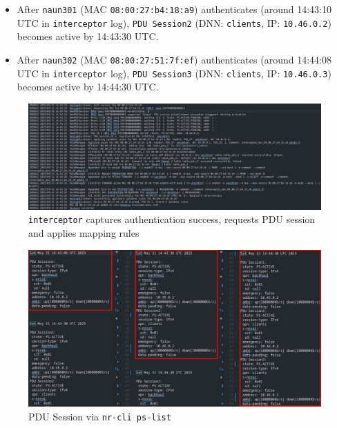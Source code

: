 \begin{itemize}
{\begin{itemize}
            \item After \texttt{naun301} (\ac{MAC} \texttt{08:00:27:b4:18:a9}) authenticates (around 14:43:10 \ac{UTC} in \texttt{interceptor} log), \texttt{PDU Session2} (\ac{DNN}: \texttt{clients}, \ac{IP}: \texttt{10.46.0.2}) becomes active by 14:43:30 \ac{UTC}.

            \item After \texttt{naun302} (\ac{MAC} \texttt{08:00:27:51:7f:ef}) authenticates (around 14:44:08 \ac{UTC} in \texttt{interceptor} log), \texttt{PDU Session3} (\ac{DNN}: \texttt{clients}, \ac{IP}: \texttt{10.46.0.3}) becomes active by 14:44:30 \ac{UTC}.
        \end{itemize}

        \begin{figure}
        \centering
            \includegraphics[width=1\linewidth]{figs/interceptor_eap_success.png}
            \caption{\texttt{interceptor} captures authentication success, requests \acs{PDU} session and applies mapping rules}
            \label{fig:interceptor_eap_success}
        \end{figure}

        \begin{figure}
            \centering
            \includegraphics[width=1\linewidth]{figs/ue_pdu_sessions.png}
            \caption{\acs{PDU} Session via \texttt{nr-cli ps-list}}
            \label{fig:ue_pdu_sessions}
        \end{figure}
    }


\end{itemize}

